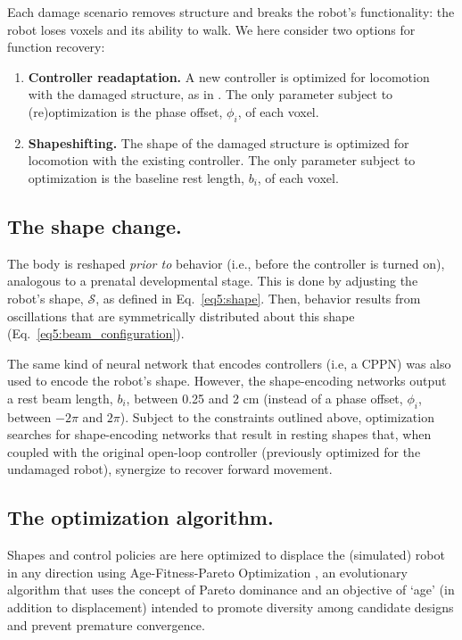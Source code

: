 Each damage scenario removes structure and breaks the robot's functionality: the robot loses voxels and its ability to walk.
We here consider two options for function recovery: 
\begin{enumerate}
    \setlength{\itemsep}{3pt}
    \item \textbf{Controller readaptation.}
    A new controller is optimized for locomotion with the damaged structure, as in \cite{bongard2006resilient,cully2015robots}.
    The only parameter subject to (re)optimization is the phase offset, $\phi_i$, of each voxel.
    \item \textbf{Shapeshifting.} The shape of the damaged structure is optimized for locomotion with the existing controller.
    The only parameter subject to optimization is the baseline rest length, $b_i$, of each voxel.
\end{enumerate}


\subsection*{The shape change.}


The body is reshaped 
\textit{prior to} behavior (i.e., before the controller is turned on), analogous to a prenatal developmental stage.
This is done by adjusting the robot's shape, $\mathcal{S}$, as defined in Eq.~\ref{eq5:shape}.
Then, behavior results from oscillations that are symmetrically distributed about this shape 
(Eq.~\ref{eq5:beam_configuration}). 

The same kind of neural network that encodes controllers 
(i.e, a CPPN) 
was also used to encode 
the robot's shape.
However, the 
shape-encoding
networks output a rest beam length, $b_i$, between 0.25 and 2 cm (instead of a phase offset, $\phi_i$, between $-2\pi$ and $2\pi$).
Subject to the constraints outlined above,
optimization searches for shape-encoding networks that result in resting shapes that, when coupled with the original open-loop controller (previously optimized for the undamaged robot), synergize to recover forward movement.


\subsection*{The optimization algorithm.}
\label{sec5:optimization}


Shapes and control policies
are here optimized to displace the (simulated) robot in any direction using Age-Fitness-Pareto Optimization \citep{schmidt2011age}, 
an evolutionary algorithm that uses the concept of Pareto dominance and an objective of `age' (in addition to displacement) intended to promote diversity among candidate designs and prevent premature convergence.


